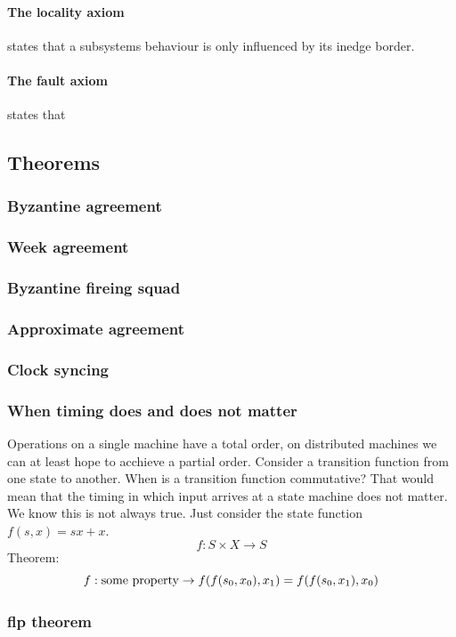 \paragraph{The locality axiom} states that a subsystems behaviour is only influenced by its inedge border.
\paragraph{The fault axiom} states that 

\subsection{Theorems}

\subsubsection{Byzantine agreement}
\subsubsection{Week agreement}
\subsubsection{Byzantine fireing squad}
\subsubsection{Approximate agreement}
\subsubsection{Clock syncing}


\subsubsection{When timing does and does not matter}
Operations on a single machine have a total order, on distributed machines we can at least hope to acchieve a partial order.
Consider a transition function from one state to another. When is a transition function commutative? That would mean that the timing in which input arrives at a state machine does not matter. We know this is not always true. Just consider the state function $f(s, x) = sx + x$. 
$$ f : S \times X \to S$$
Theorem:
$$ f: \text{some property} \to f(f(s_0, x_0), x_1) = f(f(s_0, x_1), x_0)$$

\subsubsection{flp theorem}

